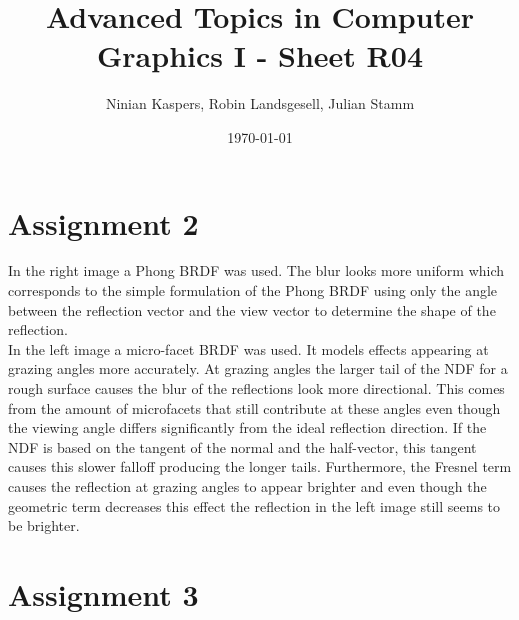 \documentclass{article}
\title{Advanced Topics in Computer Graphics I - Sheet R04}
\author{Ninian Kaspers, Robin Landsgesell, Julian Stamm}
\date{\today}
\begin{document}
    \maketitle

    \section*{Assignment 2}
    
    In the right image a Phong BRDF was used. The blur looks more uniform which corresponds to the simple formulation of the Phong BRDF using only the angle between the reflection vector and the view vector to determine the shape of the reflection.\\
    In the left image a micro-facet BRDF was used. It models effects appearing at grazing angles more accurately. At grazing angles the larger tail of the NDF for a rough surface causes the blur of the reflections look more directional. This comes from the amount of microfacets that still contribute at these angles even though the viewing angle differs significantly from the ideal reflection direction. If the NDF is based on the tangent of the normal and the half-vector, this tangent causes this slower falloff producing the longer tails. Furthermore, the Fresnel term causes the reflection at grazing angles to appear brighter and even though the geometric term decreases this effect the reflection in the left image still seems to be brighter.

    \section*{Assignment 3}
\end{document}
